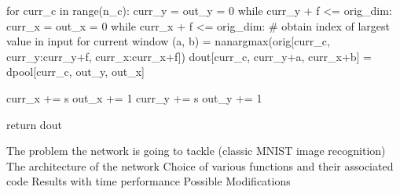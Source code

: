     for curr_c in range(n_c):
        curr_y = out_y = 0
        while curr_y + f <= orig_dim:
            curr_x = out_x = 0
            while curr_x + f <= orig_dim:
                # obtain index of largest value in input for current window
                (a, b) = nanargmax(orig[curr_c, curr_y:curr_y+f, curr_x:curr_x+f])
                dout[curr_c, curr_y+a, curr_x+b] = dpool[curr_c, out_y, out_x]
                
                curr_x += s
                out_x += 1
            curr_y += s
            out_y += 1
        
    return dout
\stoptyping

\startitemize
\startitem 
The problem the network is going to tackle (classic MNIST image recognition)
\stopitem
\startitem
The architecture of the network
\stopitem
\startitem
Choice of various functions and their associated code
\stopitem
\startitem
Results with time performance
\stopitem
\startitem
Possible Modifications
\stopitem
\stopitemize
\stopsection